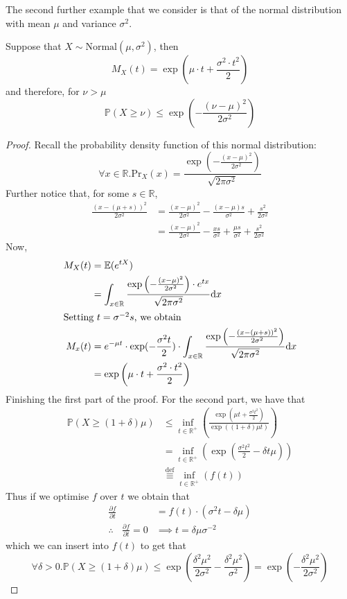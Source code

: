 	The second further example that we consider is that of the normal distribution with mean
	$\mu$ and variance $\sigma^2$.
	\begin{claim}
		Suppose that $X \sim  \mathrm{Normal}(\mu, \sigma^2)$, then 
		$$	
			M_X(t) = \exp\left(\mu \cdot t + \frac{\sigma^2 \cdot t^2}{2}\right)
		$$
		and therefore, for $\nu > \mu$
		$$
			\mathbb{P}(X \geq \nu) \leq \exp\left(-\frac{(\nu-\mu)^2}{2\sigma^2}\right)
		$$
	\end{claim}
	\begin{proof}
		Recall the probability density function of this normal distribution:
		$$
			\forall x \in \mathbb{R} . 
			\mathrm{Pr}_X(x) = 
			\frac{\exp\left(-\frac{(x-\mu)^2}{2\sigma^2}\right)}{\sqrt{2\pi\sigma^2}}
		$$
		Further notice that, for some $s \in \mathbb{R}$,
		\begin{align*}
			\frac{(x - (\mu+s))^2}{2\sigma^2} &= \frac{(x-\mu)^2}{2\sigma^2} - 
			\frac{(x-\mu)s}{\sigma^2} + \frac{s^2}{2\sigma^2} \\
			&= \frac{(x-\mu)^2}{2\sigma^2} - \frac{xs}{\sigma^2}+\frac{\mu s}{\sigma^2}
			+ \frac{s^2}{2\sigma^2}
		\end{align*}
		Now,
		\begin{align*}
			M_X(t) &= \mathbb{E}(e^{tX}) \\
			&= \int_{x \in \mathbb{R}} 
			\frac{\exp\left(-\frac{(x-\mu)^2}{2\sigma^2}\right) \cdot e^{tx}
			}{\sqrt{2\pi\sigma^2}} \mathrm{d}x \\
			\intertext{Setting $t = \sigma^{-2} s$, we obtain}
			M_x(t) &= e^{-\mu t} \cdot \exp({-\frac{\sigma^2 t}{2}}) \cdot
			\int_{x \in \mathbb{R}}
		\frac{\exp\left(-\frac{(x-(\mu+s))^2}{2\sigma^2}\right)}{\sqrt{2\pi\sigma^2}}
			\mathrm{d}x
			\\
			&= \exp\left(\mu \cdot t + \frac{\sigma^2 \cdot t^2}{2}\right)
		\end{align*}
		Finishing the first part of the proof. For the second part, we have that
		\begin{align*}
			\mathbb{P}(X \geq (1+\delta)\mu ) 
			&\leq \inf_{t \in \mathbb{R}^+}\left(\frac{\exp\left(
			\mu t + \frac{\sigma^2t^2}{2}\right)}{\exp((1+\delta)\mu t)}\right) \\
			&= \inf_{t\in \mathbb{R}^+} \left(\exp\left(\frac{\sigma^2t^2}{2} - 
			\delta t \mu\right)\right) \\
			&\stackrel{\mathrm{def}}{\equiv} \inf_{t\in \mathbb{R}^+}(f(t))
		\end{align*}
		Thus if we optimise $f$ over $t$ we obtain that
		\begin{align*}
		\frac{\partial f}{\partial t} &=  f(t) \cdot (\sigma^2t-\delta \mu)\\
		\therefore\ \ \ \  \frac{\partial f}{\partial t} = 0 &\implies t= \delta\mu\sigma^{-2}
		\end{align*}
		which we can insert into $f(t)$ to get that
		$$
			\forall \delta > 0 . \mathbb{P}(X \geq (1+\delta)\mu) \leq 
			\exp\left(\frac{\delta^2\mu^2}{2\sigma^2}-\frac{\delta^2\mu^2}{\sigma^2}\right)
			=\exp\left(-\frac{\delta^2\mu^2}{2\sigma^2}\right)
		$$
	\end{proof}
	
